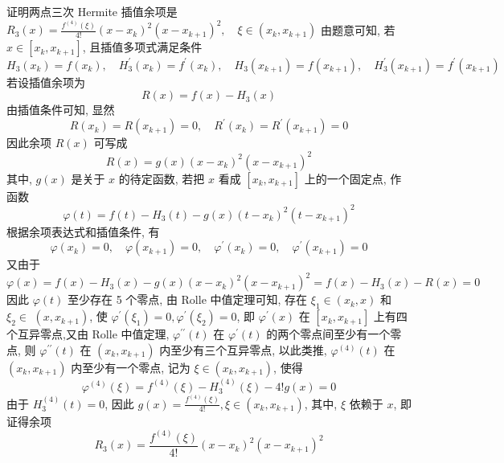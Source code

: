 \begin{tcolorbox}[enhanced,colback=10,colframe=9,breakable,coltitle=green!25!black,title=2024]
证明两点三次 Hermite 插值余项是
$
R_{3}(x)=\frac{f^{(4)}(\xi)}{4!}\left(x-x_{k}\right)^{2}\left(x-x_{k+1}\right)^{2}, \quad \xi \in\left(x_{k}, x_{k+1}\right)
$
\tcblower
 由题意可知, 若 $ x \in\left[x_{k}, x_{k+1}\right] $, 且插值多项式满足条件
$$
H_{3}\left(x_{k}\right)=f\left(x_{k}\right), \quad H_{3}^{\prime}\left(x_{k}\right)=f^{\prime}\left(x_{k}\right), \quad H_{3}\left(x_{k+1}\right)=f\left(x_{k+1}\right), \quad H_{3}^{\prime}\left(x_{k+1}\right)=f^{\prime}\left(x_{k+1}\right)
$$
若设插值余项为
$$
R(x)=f(x)-H_{3}(x)
$$
由插值条件可知, 显然
$$
R\left(x_{k}\right)=R\left(x_{k+1}\right)=0, \quad R^{\prime}\left(x_{k}\right)=R^{\prime}\left(x_{k+1}\right)=0
$$
因此余项 $ R(x) $ 可写成
$$
R(x)=g(x)\left(x-x_{k}\right)^{2}\left(x-x_{k+1}\right)^{2}
$$
其中, $ g(x) $ 是关于 $ x $ 的待定函数, 若把 $ x $ 看成 $ \left[x_{k}, x_{k+1}\right] $ 上的一个固定点, 作函数
$$
\varphi(t)=f(t)-H_{3}(t)-g(x)\left(t-x_{k}\right)^{2}\left(t-x_{k+1}\right)^{2}
$$
根据余项表达式和插值条件, 有
$$
\varphi\left(x_{k}\right)=0, \quad \varphi\left(x_{k+1}\right)=0, \quad \varphi^{\prime}\left(x_{k}\right)=0, \quad \varphi^{\prime}\left(x_{k+1}\right)=0
$$
又由于
$$
\varphi(x)=f(x)-H_{3}(x)-g(x)\left(x-x_{k}\right)^{2}\left(x-x_{k+1}\right)^{2}=f(x)-H_{3}(x)-R(x)=0
$$
因此 $ \varphi(t) $ 至少存在 5 个零点, 由 Rolle 中值定理可知, 存在 $ \xi_{1} \in\left(x_{k}, x\right) $ 和 $ \xi_{2} \in $ $ \left(x, x_{k+1}\right) $, 使 $ \varphi^{\prime}\left(\xi_{1}\right)=0, \varphi^{\prime}\left(\xi_{2}\right)=0 $, 即 $ \varphi^{\prime}(x) $ 在 $ \left[x_{k}, x_{k+1}\right] $ 上有四个互异零点,又由 Rolle 中值定理, $ \varphi^{\prime \prime}(t) $ 在 $ \varphi^{\prime}(t) $ 的两个零点间至少有一个零点, 则 $ \varphi^{\prime \prime}(t) $ 在 $ \left(x_{k}, x_{k+1}\right) $ 内至少有三个互异零点, 以此类推, $ \varphi^{(4)}(t) $ 在 $ \left(x_{k}, x_{k+1}\right) $ 内至少有一个零点, 记为 $ \xi \in\left(x_{k}, x_{k+1}\right) $, 使得
$$
\varphi^{(4)}(\xi)=f^{(4)}(\xi)-H_{3}^{(4)}(\xi)-4!g(x)=0
$$
由于 $ H_{3}^{(4)}(t)=0 $, 因此 $ g(x)=\frac{f^{(4)}(\xi)}{4!}, \xi \in\left(x_{k}, x_{k+1}\right) $, 其中, $ \xi $ 依赖于 $ x $, 即证得余项
$$
R_{3}(x)=\frac{f^{(4)}(\xi)}{4!}\left(x-x_{k}\right)^{2}\left(x-x_{k+1}\right)^{2}
$$

\end{tcolorbox}


